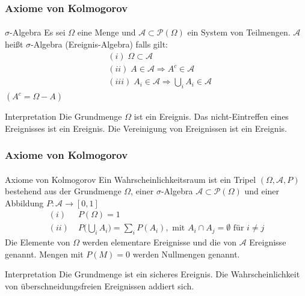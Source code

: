 \documentclass{beamer}
\begin{document}
\begin{frame}
    \frametitle{Axiome von Kolmogorov}
\framesubtitle{}
\begin{block}{$\sigma$-Algebra}
Es sei $\Omega$ eine Menge und $\mathcal{A} \subset  \mathcal{P}(\Omega)$ ein System von Teilmengen. $\mathcal{A}$ heißt $\sigma$-Algebra (Ereignis-Algebra) falls gilt:
\begin{align*}
& (i) \; \Omega \subset \mathcal{A} \\
& (ii) \; A \in \mathcal{A} \Rightarrow A^c \in \mathcal{A} \\
& (iii) \; A_i \in \mathcal{A} \Rightarrow \bigcup_i A_i \in \mathcal{A} 
\end{align*}
$(A^c = \Omega - A)$
\end{block}

\begin{block}{Interpretation}
Die Grundmenge $\Omega$ ist ein Ereignis. Das nicht-Eintreffen eines Ereignisses ist ein Ereignis. Die Vereinigung von Ereignissen ist ein Ereignis.
\end{block}


 \end{frame}


\begin{frame}
    \frametitle{Axiome von Kolmogorov}
\framesubtitle{}
\begin{block}{Axiome von Kolmogorov}
Ein Wahrscheinlichkeitsraum ist ein Tripel $(\Omega, \mathcal{A}, P)$ bestehend aus der Grundmenge $\Omega$, einer $\sigma$-Algebra $\mathcal{A} \subset  \mathcal{P}(\Omega)$ und einer Abbildung
$P : \mathcal{A} \to [0,1]$
\begin{align*}
(i) & \; P(\Omega) = 1 \\
(ii) & \;  P \biggl(  \bigcup_i A_i  \biggr) = \sum_i P(A_i), \text{ mit } A_i \cap A_j = \emptyset \text{ für } i \neq j
\end{align*}
Die Elemente von $\Omega$ werden elementare Ereignisse und die von $\mathcal{A}$ Ereignisse genannt. Mengen mit $P(M) = 0$ werden Nullmengen genannt.
\end{block}


\begin{block}{Interpretation}
Die Grundmenge ist ein sicheres Ereignis. Die Wahrscheinlichkeit von überschneidungsfreien Ereignissen addiert sich.
\end{block}


 \end{frame}
\end{document}
